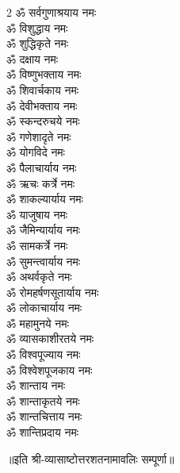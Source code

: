 \begin{flushleft}
\begin{multicols}{2}
ॐ सर्वगुणाश्रयाय नमः\\
ॐ विशुद्धाय नमः\\
ॐ शुद्धिकृते नमः\\
ॐ दक्षाय नमः\\
ॐ विष्णुभक्ताय नमः\\
ॐ शिवार्चकाय नमः\\
ॐ देवीभक्ताय नमः\\
ॐ स्कन्दरुचये नमः\\
ॐ गणेशादृते नमः\\
ॐ योगविदे नमः\hfill{}\\
ॐ पैलाचार्याय नमः\\
ॐ ऋचः कर्त्रे नमः\\
ॐ शाकल्यार्याय नमः\\
ॐ याजुषाय नमः\\
ॐ जैमिन्यार्याय नमः\\
ॐ सामकर्त्रे नमः\\
ॐ सुमन्त्वार्याय नमः\\
ॐ अथर्वकृते नमः\\
ॐ रोमहर्षणसूतार्याय नमः\\
ॐ लोकाचार्याय नमः\hfill{}\\
ॐ महामुनये नमः\\
ॐ व्यासकाशीरतये नमः\\
ॐ विश्वपूज्याय नमः\\
ॐ विश्वेशपूजकाय नमः\\
ॐ शान्ताय नमः\\
ॐ शान्ताकृतये नमः\\
ॐ शान्तचित्ताय नमः\\
ॐ शान्तिप्रदाय नमः\hfill{}\\
\end{multicols}
\end{flushleft}

॥इति श्री-व्यासाष्टोत्तरशतनामावलिः सम्पूर्णा॥